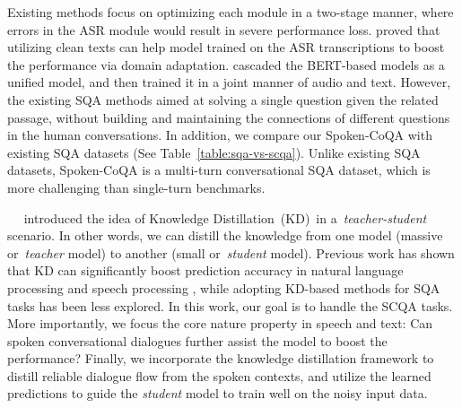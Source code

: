 \documentclass[11pt]{article}
\newcommand{\myparagraph}[1]{\vspace{2pt}\noindent{\bf{#1}}~~}
\begin{document}
Existing methods \cite{tseng2016towards,serdyuk2018towards,su2020improving} focus on optimizing each module in a two-stage manner, where errors in the ASR module would result in severe performance loss. \citet{lee2019mitigating} proved that utilizing clean texts can help model trained on the ASR transcriptions to boost the performance via domain adaptation. \citet{chuang2019speechbert} cascaded the BERT-based models as a unified model, and then trained it in a joint manner of audio and text. However, the existing SQA methods aimed at solving a single question given the related passage, without building and maintaining the connections of different questions in the human conversations. In addition, we compare our Spoken-CoQA with existing SQA datasets (See Table~\ref{table:sqa-vs-scqa}). Unlike existing SQA datasets, Spoken-CoQA is a multi-turn conversational SQA dataset, which is more challenging than single-turn benchmarks.


\myparagraph{Knowledge Distillation.}
\citet{hinton2015distilling} introduced the idea of Knowledge Distillation~(KD)~in a~\textit{teacher-student} scenario. In other words, we can distill the knowledge from one model (massive or~\textit{teacher} model) to another (small or~\textit{student} model). Previous work has shown that KD can significantly boost prediction accuracy in natural language processing and speech processing \cite{kim2016sequence,hu2018attention,huang2018knowledge,hahn2019self,liu2021auto,liu2021aligning,cheng2016random,cheng2016hybrid,cheng2016identification,you2020unsupervised,you2021momentum,you2022simcvd,you2022class,you2018structurally,you2019ct,you2019low,lyu2018super,lyu2019super,guha2020deep,yang2020nuset,ma2021good,ma2021undistillable}, while adopting KD-based methods for SQA tasks has been less explored. In this work, our goal is to handle the SCQA tasks. More importantly, we focus the core nature property in speech and text: Can spoken conversational dialogues further assist the model to boost the performance? Finally, we incorporate the knowledge distillation framework to distill reliable dialogue flow from the spoken contexts, and utilize the learned predictions to guide the \textit{student} model to train well on the noisy input data.
\end{document}
